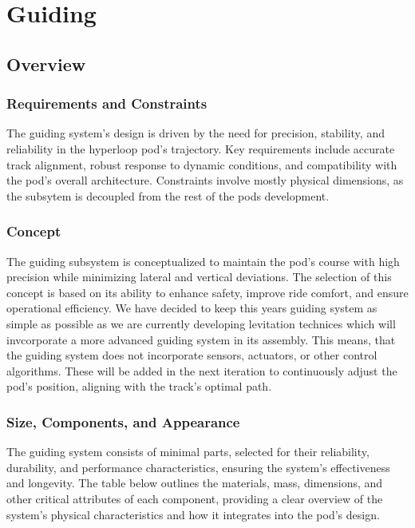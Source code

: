 \section{Guiding}

\subsection{Overview}

\subsubsection{Requirements and Constraints}
The guiding system's design is driven by the need for precision, stability, and reliability in the hyperloop pod's trajectory. Key requirements include accurate track alignment, robust response to dynamic conditions, and compatibility with the pod's overall architecture. Constraints involve mostly physical dimensions, as the subsytem is decoupled from the rest of the pods development.

\subsubsection{Concept}
The guiding subsystem is conceptualized to maintain the pod's course with high precision while minimizing lateral and vertical deviations. The selection of this concept is based on its ability to enhance safety, improve ride comfort, and ensure operational efficiency. We have decided to keep this years guiding system as simple as possible as we are currently developing levitation technices which will invcorporate a more advanced guiding system in its assembly. This means, that the guiding system does not incorporate sensors, actuators, or other control algorithms. These will be added in the next iteration to continuously adjust the pod's position, aligning with the track's optimal path.

\subsubsection{Size, Components, and Appearance}
The guiding system consists of minimal parts, selected for their reliability, durability, and performance characteristics, ensuring the system's effectiveness and longevity. The table below outlines the materials, mass, dimensions, and other critical attributes of each component, providing a clear overview of the system's physical characteristics and how it integrates into the pod's design.

